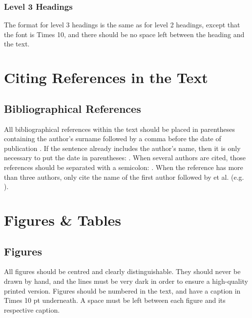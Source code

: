 \documentclass[10pt, a4paper]{article}
\begin{document}
\subsubsection{Level 3 Headings}

The format for level 3 headings is the same as for level 2 headings, except that
the font is Times 10, and there should be no space left between the heading and
the text.

%

\section{Citing References in the Text}

\subsection{Bibliographical References}

All bibliographical references within the text should be placed in parentheses
containing the author's surname followed by a comma before the date of
publication \cite{Martin-90}. If the sentence already includes the author's
name, then it is only necessary to put the date in parentheses:
. When several authors are cited, those references should be
separated with a semicolon: \cite{Martin-90,CastorPollux-92}. When the reference
has more than three authors, only cite the name of the first author followed by
et al. (e.g. \cite{Superman-Batman-Catwoman-Spiderman-00}).

\section{Figures \& Tables}
\subsection{Figures}

All figures should be centred and clearly distinguishable. They should never be
drawn by hand, and the lines must be very dark in order to ensure a high-quality
printed version. Figures should be numbered in the text, and have a caption in
Times 10 pt underneath. A space must be left between each figure and its
respective caption. 
\end{document}
